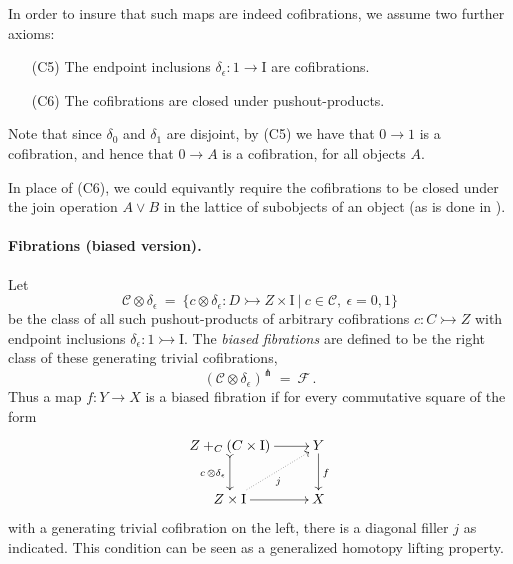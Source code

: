 \documentclass[12pt]{article}
\newcommand{\mono}{\ensuremath{\rightarrowtail}}
\newcommand{\ra}{\ensuremath{\rightarrow}}
\newcommand{\I}{\ensuremath{\mathrm{I}}}
\newtheorem{proposition}[theorem]{Proposition}
\theoremstyle{remark}
\theoremstyle{definition}
\begin{document}
In order to insure that such maps are indeed cofibrations, we assume  two further axioms:
\begin{enumerate}
\item[(C5)] The endpoint inclusions $\delta_\epsilon : 1 \ra \I$ are cofibrations.
\item[(C6)] The cofibrations are closed under pushout-products.  
\end{enumerate}

Note that since $\delta_0$ and $\delta_1$ are disjoint, by (C5) we have that $0 \ra 1$ is a cofibration, and hence that $0\ra A$ is a cofibration, for all objects $A$.

In place of (C6), we could equivantly require the cofibrations to be closed under the join operation $A\vee B$ in the lattice of subobjects of an object (as is done in \cite{CCHS,OP}).
\medskip

\paragraph{Fibrations (biased version).}
Let 
\[
\mathcal{C}\otimes \delta_\epsilon\ =\ \{ c \otimes \delta_\epsilon : D \mono Z \times \I\ |\ c \in\mathcal{C},\ \epsilon = 0,1 \}
\]
be the class of all such pushout-products of arbitrary cofibrations $c : C \mono Z$ with endpoint inclusions $\delta_\epsilon : 1 \mono \I$.
The \emph{biased fibrations} are defined to be the right class of these generating trivial cofibrations,
\[
(\mathcal{C}\otimes \delta_\epsilon)^\pitchfork\ =\ \mathcal{F}\,.
\]
Thus a map $f : Y\ra X$ is a biased fibration if for every commutative square of the form
\begin{equation}\label{diagram:biasedfillers}
\xymatrix{
Z +_C (C\times\I) \ar@{>->}[d]_{c\, \otimes \delta_\epsilon} \ar[r] & Y \ar[d]^f \\
Z\times \I \ar@{.>}[ru]_{j} \ar[r] & X
}
\end{equation}
with a generating trivial cofibration on the left, there is a diagonal filler $j$ as indicated. This condition can be seen as a generalized homotopy lifting property.
\end{document}
